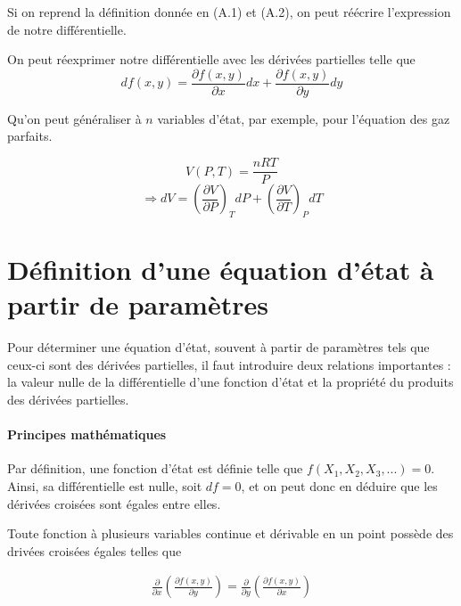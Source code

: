 Si on reprend la définition donnée en (A.1) et (A.2), on peut réécrire l'expression de notre différentielle.
\begin{corollary}
On peut réexprimer notre différentielle avec les dérivées partielles telle que
\begin{equation}
df(x,y)=\frac{\partial f(x,y)}{\partial x}dx+\frac{\partial f(x,y)}{\partial y}dy
\end{equation}
\end{corollary}

Qu'on peut généraliser à $n$ variables d'état, par exemple, pour l'équation des gaz parfaits.

\begin{example}

$$V(P,T)=\frac{nRT}{P}$$
$$\Rightarrow dV=\left ( \frac{\partial V}{\partial P}\right )_T dP+\left ( \frac{\partial V}{\partial T}\right )_P dT$$

\end{example}

\section{Définition d'une équation d'état à partir de paramètres}

Pour déterminer une équation d'état, souvent à partir de paramètres tels que ceux-ci sont des dérivées partielles, il faut introduire deux relations importantes : la valeur nulle de la différentielle d'une fonction d'état et la propriété du produits des dérivées partielles.

\paragraph{Principes mathématiques} 

Par définition, une fonction d'état est définie telle que $f(X_1, X_2, X_3, ...)=0$. Ainsi, sa différentielle est nulle, soit $df=0$, et on peut donc en déduire que les dérivées croisées sont égales entre elles. 

\begin{theorem}

Toute fonction à plusieurs variables continue et dérivable en un point possède des drivées croisées égales telles que

\begin{eqnarray}
\frac{\partial}{\partial x}\left ( \frac{\partial f(x,y)}{\partial y} \right ) = \frac{\partial}{\partial y}\left ( \frac{\partial f(x,y)}{\partial x} \right ) 
\end{eqnarray}
\end{theorem}




